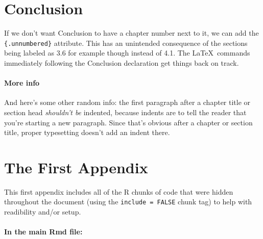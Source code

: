 \documentclass[12pt,twoside]{reedthesis}
\begin{document}
  \chapter*{Conclusion}\label{conclusion}
  
  \setcounter{chapter}{4} \setcounter{section}{0}
  
  If we don't want Conclusion to have a chapter number next to it, we can
  add the \texttt{\{.unnumbered\}} attribute. This has an unintended
  consequence of the sections being labeled as 3.6 for example though
  instead of 4.1. The \LaTeX~commands immediately following the Conclusion
  declaration get things back on track.
  
  \subsubsection{More info}\label{more-info}
  
  And here's some other random info: the first paragraph after a chapter
  title or section head \emph{shouldn't be} indented, because indents are
  to tell the reader that you're starting a new paragraph. Since that's
  obvious after a chapter or section title, proper typesetting doesn't add
  an indent there.
  
  \appendix
  
  \chapter{The First Appendix}\label{the-first-appendix}
  
  This first appendix includes all of the R chunks of code that were
  hidden throughout the document (using the \texttt{include\ =\ FALSE}
  chunk tag) to help with readibility and/or setup.
  
  \subsubsection{In the main Rmd file:}\label{in-the-main-rmd-file}
  
  \begin{Shaded}
  \begin{Highlighting}[]
    \NormalTok{(}\NormalTok{, } \NormalTok{)}
    \NormalTok{(}\NormalTok{)}
  \NormalTok{\}}
  \end{Highlighting}
  \end{Shaded}
  
\end{document}
